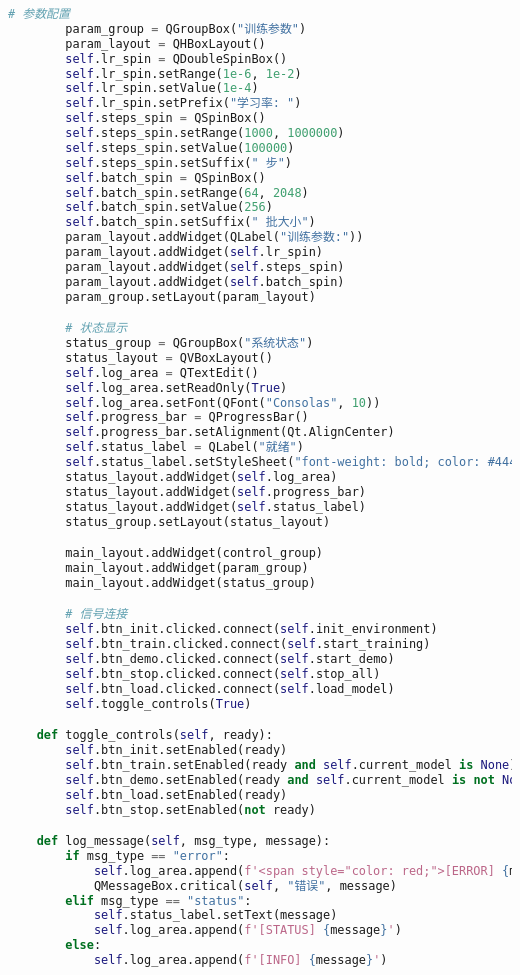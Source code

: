 \begin{lstlisting}[language=Python]
        # 参数配置
        param_group = QGroupBox("训练参数")
        param_layout = QHBoxLayout()
        self.lr_spin = QDoubleSpinBox()
        self.lr_spin.setRange(1e-6, 1e-2)
        self.lr_spin.setValue(1e-4)
        self.lr_spin.setPrefix("学习率: ")
        self.steps_spin = QSpinBox()
        self.steps_spin.setRange(1000, 1000000)
        self.steps_spin.setValue(100000)
        self.steps_spin.setSuffix(" 步")
        self.batch_spin = QSpinBox()
        self.batch_spin.setRange(64, 2048)
        self.batch_spin.setValue(256)
        self.batch_spin.setSuffix(" 批大小")
        param_layout.addWidget(QLabel("训练参数:"))
        param_layout.addWidget(self.lr_spin)
        param_layout.addWidget(self.steps_spin)
        param_layout.addWidget(self.batch_spin)
        param_group.setLayout(param_layout)

        # 状态显示
        status_group = QGroupBox("系统状态")
        status_layout = QVBoxLayout()
        self.log_area = QTextEdit()
        self.log_area.setReadOnly(True)
        self.log_area.setFont(QFont("Consolas", 10))
        self.progress_bar = QProgressBar()
        self.progress_bar.setAlignment(Qt.AlignCenter)
        self.status_label = QLabel("就绪")
        self.status_label.setStyleSheet("font-weight: bold; color: #444;")
        status_layout.addWidget(self.log_area)
        status_layout.addWidget(self.progress_bar)
        status_layout.addWidget(self.status_label)
        status_group.setLayout(status_layout)

        main_layout.addWidget(control_group)
        main_layout.addWidget(param_group)
        main_layout.addWidget(status_group)

        # 信号连接
        self.btn_init.clicked.connect(self.init_environment)
        self.btn_train.clicked.connect(self.start_training)
        self.btn_demo.clicked.connect(self.start_demo)
        self.btn_stop.clicked.connect(self.stop_all)
        self.btn_load.clicked.connect(self.load_model)
        self.toggle_controls(True)

    def toggle_controls(self, ready):
        self.btn_init.setEnabled(ready)
        self.btn_train.setEnabled(ready and self.current_model is None)
        self.btn_demo.setEnabled(ready and self.current_model is not None)
        self.btn_load.setEnabled(ready)
        self.btn_stop.setEnabled(not ready)

    def log_message(self, msg_type, message):
        if msg_type == "error":
            self.log_area.append(f'<span style="color: red;">[ERROR] {message}</span>')
            QMessageBox.critical(self, "错误", message)
        elif msg_type == "status":
            self.status_label.setText(message)
            self.log_area.append(f'[STATUS] {message}')
        else:
            self.log_area.append(f'[INFO] {message}')


\end{lstlisting}
